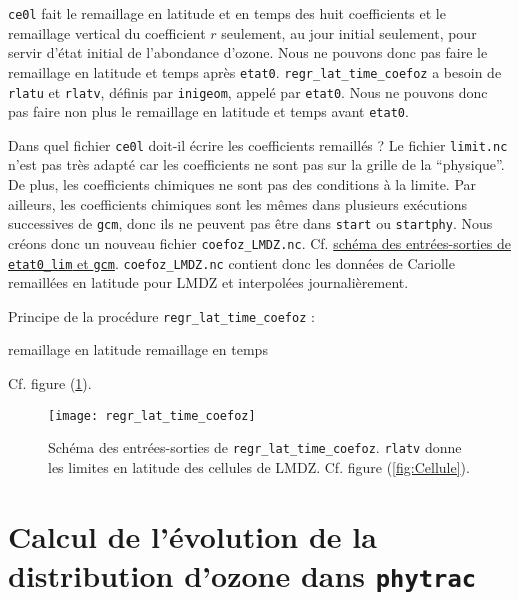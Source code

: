 \documentclass[a4paper,english,french]{article}
\begin{document}
\verb+ce0l+ fait le remaillage en latitude et en temps des huit
coefficients et le remaillage vertical du coefficient $r$ seulement,
au jour initial seulement, pour servir d'état initial de l'abondance
d'ozone. Nous ne pouvons donc pas faire le remaillage en latitude et
temps après \verb+etat0+. \verb+regr_lat_time_coefoz+ a besoin de
\verb+rlatu+ et \verb+rlatv+, définis par \verb+inigeom+, appelé par
\verb+etat0+. Nous ne pouvons donc pas faire non plus le remaillage en
latitude et temps avant \verb+etat0+.

Dans quel fichier \verb+ce0l+ doit-il écrire les coefficients
remaillés ? Le fichier \verb+limit.nc+ n'est pas très adapté car les
coefficients ne sont pas sur la grille de la ``physique''. De plus,
les coefficients chimiques ne sont pas des conditions à la limite. Par
ailleurs, les coefficients chimiques sont les mêmes dans plusieurs
exécutions successives de \verb+gcm+, donc ils ne peuvent pas être
dans \verb+start+ ou \verb+startphy+. Nous créons donc un nouveau
fichier \verb+coefoz_LMDZ.nc+. Cf.
\href{file:///user/guez/Documents/Informatique_fonctionnement/Programs/Guide_IPSL_climate_models/inout
  LMDZE.odg}{schéma des entrées-sorties de \texttt{etat0\_lim} et
  \texttt{gcm}}. \verb+coefoz_LMDZ.nc+ contient donc les données de
Cariolle remaillées en latitude pour LMDZ et interpolées
journalièrement.

Principe de la procédure \verb+regr_lat_time_coefoz+ :
\begin{algorithmic}
  \STATE remaillage en latitude
  \STATE remaillage en temps
  \ENDFOR
\end{algorithmic}
Cf. figure (\ref{fig:regr_lat_time_coefoz}).
\begin{figure}[htbp]
  \centering
  \texttt{[image: regr\_lat\_time\_coefoz]}
  \caption[Schéma des entrées-sorties de
  \texttt{regr\_lat\_time\_coefoz}]{Schéma des entrées-sorties de
    \texttt{regr\_lat\_time\_coefoz}. \texttt{rlatv} donne les limites
    en latitude des cellules de LMDZ. Cf. figure (\ref{fig:Cellule}).}
  \label{fig:regr_lat_time_coefoz}
\end{figure}

\section[Évolution de la distribution d'ozone dans
\texttt{phytrac}]{Calcul de l'évolution de la distribution d'ozone
  dans \texttt{phytrac}}
\end{document}
